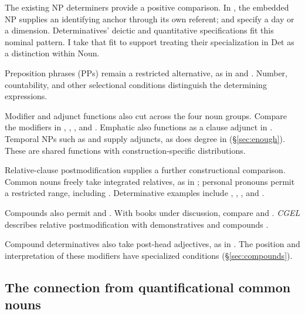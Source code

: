 \documentclass[12pt]{article}
\begin{document}
The existing NP determiners provide a positive comparison. In , the embedded NP supplies an identifying anchor through its own referent;  and  specify a day or a dimension. Determinatives' deictic and quantitative specifications fit this nominal pattern. I take that fit to support treating their specialization in Det as a distinction within Noun.

Preposition phrases (PPs) remain a restricted alternative, as in  and  \citep[356]{huddleston2002}. Number, countability, and other selectional conditions distinguish the determining expressions.

Modifier and adjunct functions also cut across the four noun groups. Compare the modifiers in , , , and . Emphatic  also functions as a clause adjunct in  \citep[1496--1497]{huddleston2002}. Temporal NPs such as  and  supply adjuncts, as does degree  in  (§\ref{sec:enough}). These are shared functions with construction-specific distributions.

Relative-clause postmodification supplies a further constructional comparison. Common nouns freely take integrated relatives, as in ; personal pronouns permit a restricted range, including  \citep[430]{huddleston2002}. Determinative examples include , , , and .

Compounds also permit  and . With books under discussion, compare  and . \textit{CGEL} describes relative postmodification with demonstratives and compounds \citep[414, 422--423]{huddleston2002}.

Compound determinatives also take post-head adjectives, as in . The position and interpretation of these modifiers have specialized conditions (§\ref{sec:compounds}).

\subsection{The connection from quantificational common nouns}\label{sec:quant-nouns}
\end{document}
